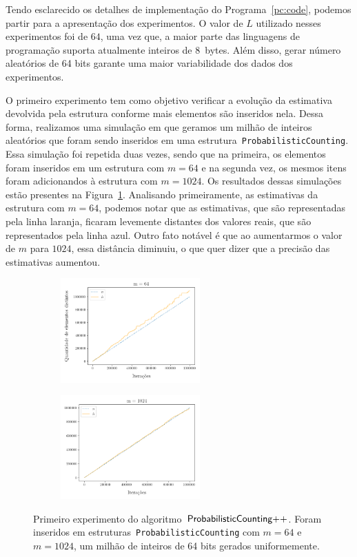 Tendo esclarecido os detalhes de implementação do Programa~\ref{pc:code}, podemos partir para a apresentação dos 
experimentos. O valor de $L$ utilizado nesses experimentos foi de $64$, uma vez que, a maior parte das linguagens de 
programação suporta atualmente inteiros de $8$~bytes. Além disso, gerar número aleatórios de 64 bits garante uma maior
variabilidade dos dados dos experimentos. 

O primeiro experimento tem como objetivo verificar a evolução da estimativa devolvida pela estrutura 
conforme mais elementos são inseridos nela. Dessa forma, realizamos uma simulação em que geramos um milhão de inteiros 
aleatórios que foram sendo inseridos em uma estrutura~\texttt{ProbabilisticCounting}. Essa simulação foi repetida duas 
vezes, sendo que na primeira, os elementos foram inseridos em um estrutura com $m = 64$ e na segunda vez, os mesmos 
itens foram adicionandos à estrutura com $m = 1024$. Os resultados dessas simulações estão presentes na 
Figura~\ref{fig:pc:experimento:01}. Analisando primeiramente, as estimativas da estrutura com $m = 64$, podemos notar 
que as estimativas, que são representadas pela linha laranja, ficaram levemente distantes dos valores reais, que são 
representados pela linha azul. Outro fato notável é que ao aumentarmos o valor de $m$ para $1024$, essa distância 
diminuiu, o que quer dizer que a precisão das estimativas aumentou.

\begin{figure}
  \centering
  \begin{subfigure}{.5\textwidth}
    \centering
    \includegraphics[width=\linewidth, height=4cm]{figuras/probabilistic_counting_full_64.png}
  \end{subfigure}%
  \begin{subfigure}{.5\textwidth}
    \centering
    \captionsetup{justification=centering}
    \includegraphics[width=\textwidth, height=4cm]{figuras/probabilistic_counting_full_1024.png}
  \end{subfigure}
  \caption{Primeiro experimento do algoritmo~$\textsf{ProbabilisticCounting{++}}$. Foram inseridos em estruturas~\texttt{ProbabilisticCounting} com 
  $m = 64$ e $m = 1024$, um milhão de inteiros de 64 bits gerados uniformemente.}
  \label{fig:pc:experimento:01}
\end{figure}


